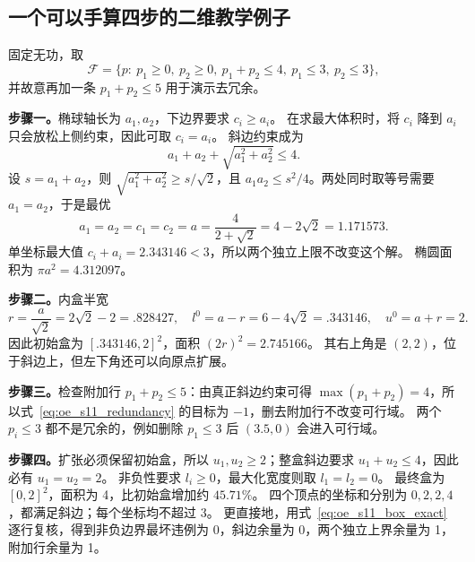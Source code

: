 \subsection{一个可以手算四步的二维教学例子}

\begin{example}
固定无功，取
\begin{equation}
 \mathcal F=\{p:\ p_1\ge0,\ p_2\ge0,\ p_1+p_2\le4,\ p_1\le3,\ p_2\le3\},
 \label{eq:oe_s11_polygon}
\end{equation}
并故意再加一条 $p_1+p_2\le5$ 用于演示去冗余。

\textbf{步骤一。}椭球轴长为 $a_1,a_2$，下边界要求 $c_i\ge a_i$。
在求最大体积时，将 $c_i$ 降到 $a_i$ 只会放松上侧约束，因此可取 $c_i=a_i$。
斜边约束成为
\[
 a_1+a_2+\sqrt{a_1^2+a_2^2}\le4.
\]
设 $s=a_1+a_2$，则 $\sqrt{a_1^2+a_2^2}\ge s/\sqrt2$，且
$a_1a_2\le s^2/4$。两处同时取等号需要 $a_1=a_2$，于是最优
\[
 a_1=a_2=c_1=c_2=a=\frac4{2+\sqrt2}=4-2\sqrt2=1.171573.
\]
单坐标最大值 $c_i+a_i=2.343146<3$，所以两个独立上限不改变这个解。
椭圆面积为 $\pi a^2=4.312097$。

\textbf{步骤二。}内盒半宽
\[
 r=\frac a{\sqrt2}=2\sqrt2-2=.828427,
 \quad l^0=a-r=6-4\sqrt2=.343146,
 \quad u^0=a+r=2.
\]
因此初始盒为 $[.343146,2]^2$，面积 $(2r)^2=2.745166$。
其右上角是 $(2,2)$，位于斜边上，但左下角还可以向原点扩展。

\textbf{步骤三。}检查附加行 $p_1+p_2\le5$：由真正斜边约束可得
$\max(p_1+p_2)=4$，所以式~\eqref{eq:oe_s11_redundancy} 的目标为 $-1$，删去附加行不改变可行域。
两个 $p_i\le3$ 都不是冗余的，例如删除 $p_1\le3$ 后 $(3.5,0)$ 会进入可行域。

\textbf{步骤四。}扩张必须保留初始盒，所以 $u_1,u_2\ge2$；整盒斜边要求 $u_1+u_2\le4$，因此必有 $u_1=u_2=2$。
非负性要求 $l_i\ge0$，最大化宽度则取 $l_1=l_2=0$。
最终盒为 $[0,2]^2$，面积为 4，比初始盒增加约 $45.71\%$。
四个顶点的坐标和分别为 $0,2,2,4$，都满足斜边；每个坐标均不超过 3。
更直接地，用式~\eqref{eq:oe_s11_box_exact} 逐行复核，得到非负边界最坏违例为 0，斜边余量为 0，两个独立上界余量为 1，附加行余量为 1。
\end{example}

